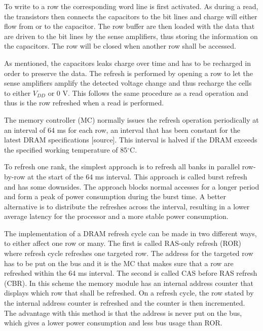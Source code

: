 To write to a row the corresponding word line is first activated. As during a read, the transistors then connects the capacitors to the bit lines and charge will either flow from or to the capacitor. The row buffer are then loaded with the data that are driven to the bit lines by the sense amplifiers, thus storing the information on the capacitors. The row will be closed when another row shall be accessed.

As mentioned, the capacitors leaks charge over time and has to be recharged in order to preserve the data. The refresh is performed by opening a row to let the sense amplifiers amplify the detected voltage change and thus recharge the cells to either \(V_{DD}\) or 0 V. This follows the same procedure as a read operation and thus is the row refreshed when a read is performed. 

The memory controller (MC) normally issues the refresh operation periodically at an interval of 64 ms for each row, an interval that has been constant for the latest DRAM specifications [source]. This interval is halved if the DRAM exceeds the specified working temperature of 85$^{\circ}$C. %

To refresh one rank, the simplest approach is to refresh all banks in parallel row-by-row at the start of the 64 ms interval. This approach is called burst refresh and has some downsides. The approach blocks normal accesses for a longer period and form a peak of power consumption during the burst time. A better alternative is to distribute the refreshes across the interval, resulting in a lower average latency for the processor and a more stable power consumption.

The implementation of a DRAM refresh cycle can be made in two different ways, to either affect one row or many. The first is called RAS-only refresh (ROR) where refresh cycle refreshes one targeted row. The address for the targeted row has to be put on the bus and it is the MC that makes sure that a row are refreshed within the 64 ms interval. The second is called CAS before RAS refresh (CBR). In this scheme the memory module has an internal address counter that displays which row that shall be refreshed. On a refresh cycle, the row stated by the internal address counter is refreshed and the counter is then incremented. The advantage with this method is that the address is never put on the bus, which gives a lower power consumption and less bus usage than ROR. 

